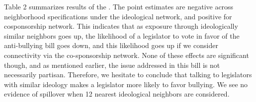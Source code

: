 \documentclass[12pt]{article}
\begin{document}
Table 2 summarizes results of the \citet{bergan2015call}. The point estimates are negative across neighborhood specifications under the ideological network, and positive for cosponsorship network. This indicates that as exposure through ideologically similar neighbors goes up, the likelihood of a legislator to vote in favor of the anti-bullying bill goes down, and this likelihood goes up if we consider connectivity via the co-sponsorship network. None of these effects are significant though, and as mentioned earlier, the issue addressed in this bill is not necessarily partisan. Therefore, we hesitate to conclude that talking to legislators with similar ideology makes a legislator more likely to favor bullying. We see no evidence of spillover when 12 nearest ideological neighbors are considered. 

\end{document}
